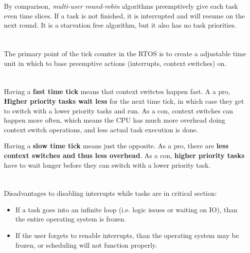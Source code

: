 \documentclass[11pt,letterpaper]{article}
\begin{document}
By comparison, \textit{multi-user round-robin} algorithms preemptively give each task even time slices. 
If a task is not finished, it is interrupted and will resume on the next round. It is a starvation free algorithm,
but it also has no task priorities.


\section{}
The primary point of the tick counter in the RTOS is to create a adjustable time unit in which to base
preemptive actions (interrupts, context switches) on. 


\section{}
Having a \textbf{fast time tick} means that context switctes happen fast. A a pro, \textbf{Higher 
priority tasks wait less} for the next time tick, in which case they get to switch with a lower priority tasks and
run. As a con, context switches can happen more often, which means the CPU has much more overhead
doing context switch operations, and less actual task execution is done.

Having a \textbf{slow time tick} means just the opposite. As a pro, there are \textbf{less context switches 
and thus less overhead}. As a con, \textbf{higher priority tasks} have to wait longer before they can switch
with a lower priority task.


\section{}
Disadvantages to disabling interrupts while tasks are in critical section:
\begin{itemize}
	\item If a task goes into an infinite loop (i.e. logic issues or waiting on IO), than the entire operating
		system is frozen.
	\item If the user forgets to renable interrupts, than the operating system may be frozen, or scheduling
		will not function properly.
\end{itemize}
\end{document}
